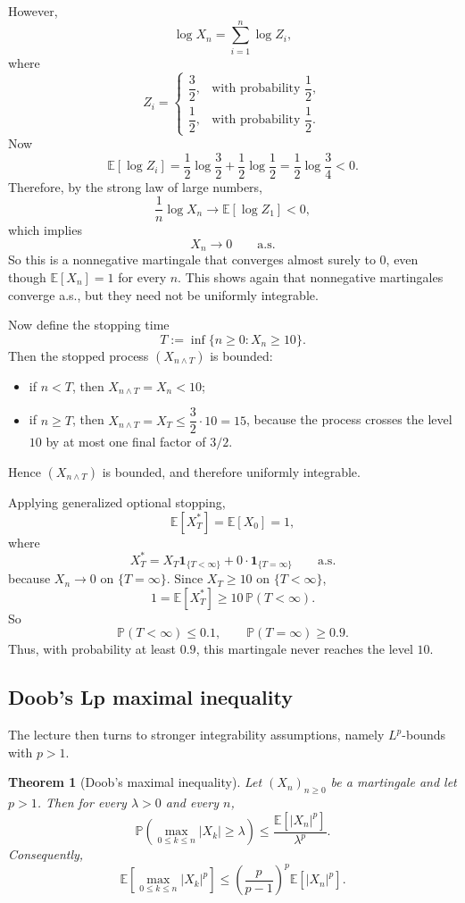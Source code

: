 \documentclass[11pt]{article}
\newtheorem{theorem}{Theorem}[section]
\theoremstyle{definition}
\begin{document}
However,
\[
\log X_n = \sum_{i=1}^n \log Z_i,
\]
where
\[
Z_i=
\begin{cases}
\dfrac32, & \text{with probability } \dfrac12,\\[0.6em]
\dfrac12, & \text{with probability } \dfrac12.
\end{cases}
\]
Now
\[
\mathbb E[\log Z_i]
=
\frac12\log\frac32 + \frac12\log\frac12
=
\frac12\log\frac34 < 0.
\]
Therefore, by the strong law of large numbers,
\[
\frac1n\log X_n \to \mathbb E[\log Z_1] <0,
\]
which implies
\[
X_n \to 0
\qquad \text{a.s.}
\]
So this is a nonnegative martingale that converges almost surely to \(0\), even though \(\mathbb E[X_n]=1\) for every \(n\). This shows again that nonnegative martingales converge a.s., but they need not be uniformly integrable.

Now define the stopping time
\[
T := \inf\{n\ge 0 : X_n\ge 10\}.
\]
Then the stopped process \((X_{n\wedge T})\) is bounded:
\begin{itemize}[leftmargin=2em]
    \item if \(n<T\), then \(X_{n\wedge T}=X_n<10\);
    \item if \(n\ge T\), then \(X_{n\wedge T}=X_T\le \dfrac32\cdot 10 = 15\), because the process crosses the level \(10\) by at most one final factor of \(3/2\).
\end{itemize}
Hence \((X_{n\wedge T})\) is bounded, and therefore uniformly integrable.

Applying generalized optional stopping,
\[
\mathbb E[X_T^*]=\mathbb E[X_0]=1,
\]
where
\[
X_T^* = X_T\mathbf 1_{\{T<\infty\}} + 0\cdot \mathbf 1_{\{T=\infty\}}
\qquad \text{a.s.}
\]
because \(X_n\to 0\) on \(\{T=\infty\}\).
Since \(X_T\ge 10\) on \(\{T<\infty\}\),
\[
1 = \mathbb E[X_T^*]
\ge 10\,\mathbb P(T<\infty).
\]
So
\[
\mathbb P(T<\infty) \le 0.1,
\qquad
\mathbb P(T=\infty) \ge 0.9.
\]
Thus, with probability at least \(0.9\), this martingale never reaches the level \(10\).

\subsection{Doob's Lp maximal inequality}

The lecture then turns to stronger integrability assumptions, namely \(L^p\)-bounds with \(p>1\).

\begin{theorem}[Doob's maximal inequality]
Let \((X_n)_{n\ge 0}\) be a martingale and let \(p>1\). Then for every \(\lambda>0\) and every \(n\),
\[
\mathbb P\!\left(\max_{0\le k\le n}|X_k|\ge \lambda\right)
\le
\frac{\mathbb E[|X_n|^p]}{\lambda^p}.
\]
Consequently,
\[
\mathbb E\!\left[\max_{0\le k\le n}|X_k|^p\right]
\le
\left(\frac{p}{p-1}\right)^p \mathbb E[|X_n|^p].
\]
\end{theorem}
\end{document}
